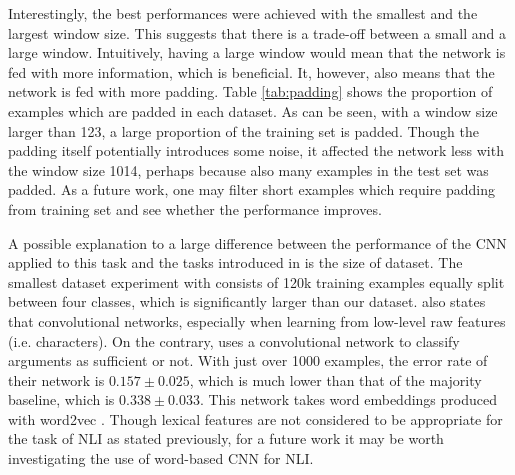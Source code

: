 Interestingly, the best performances were achieved with the smallest and the largest window size.
This suggests that there is a trade-off between a small and a large window.
Intuitively, having a large window would mean that the network is fed with more information, which is beneficial.
It, however, also means that the network is fed with more padding.
Table \ref{tab:padding} shows the proportion of examples which are padded in each dataset.
As can be seen, with a window size larger than 123, a large proportion of the training set is padded.
Though the padding itself potentially introduces some noise, it affected the network less with the window size 1014, perhaps because also many examples in the test set was padded.
As a future work, one may filter short examples which require padding from training set and see whether the performance improves.

A possible explanation to a large difference between the performance of the CNN applied to this task and the tasks introduced in \citep{zhang2015character} is the size of dataset.
The smallest dataset \cite{zhang2015character} experiment with consists of 120k training examples equally split between four classes, which is significantly larger than our dataset.
\cite{zhang2015character} also states that convolutional networks, especially when learning from low-level raw features (i.e. characters).
On the contrary, \cite{stab2017recognizing} uses a convolutional network to classify arguments as sufficient or not.
With just over 1000 examples, the error rate of their network is $0.157 \pm 0.025$, which is much lower than that of the majority baseline, which is $0.338 \pm 0.033$.
This network takes word embeddings produced with word2vec \citep{mikolov2013distributed}.
Though lexical features are not considered to be appropriate for the task of NLI as stated previously, for a future work it may be worth investigating the use of word-based CNN for NLI.